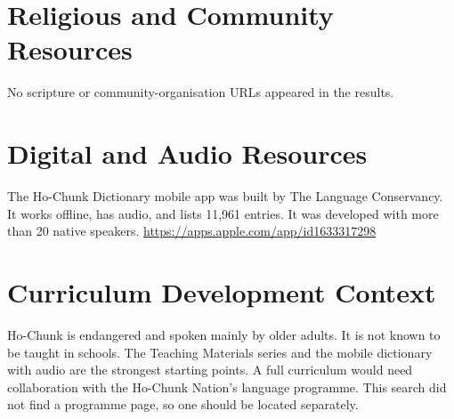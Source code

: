 \documentclass[12pt]{article}
\begin{document}
\section{Religious and Community Resources}
No scripture or community-organisation URLs appeared in the results.

\section{Digital and Audio Resources}
The Ho-Chunk Dictionary mobile app was built by The Language Conservancy. It works offline, has audio, and lists 11,961 entries. It was developed with more than 20 native speakers. \url{https://apps.apple.com/app/id1633317298}

\section{Curriculum Development Context}
Ho-Chunk is endangered and spoken mainly by older adults. It is not known to be taught in schools. The Teaching Materials series and the mobile dictionary with audio are the strongest starting points. A full curriculum would need collaboration with the Ho-Chunk Nation's language programme. This search did not find a programme page, so one should be located separately.
\end{document}
